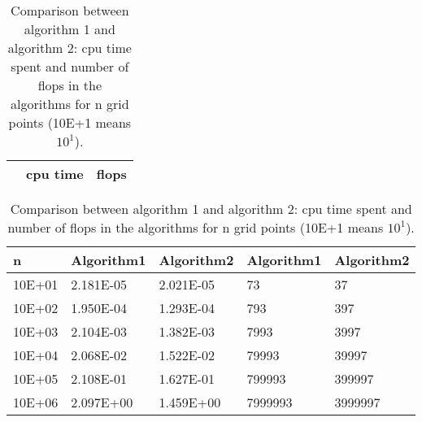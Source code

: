 \documentclass[11pt]{article}
\begin{document}
\begin{table}[H]
\begin{center}
\begin{tabular}{|p{24mm}|p{52.25mm}|p{52mm}|}
\hline
 &\hspace{17mm}  cpu time    & \hspace{22mm} flops \\ \hline
\end{tabular}
\begin{tabular}{|p{24mm}|p{24mm}|p{24mm}|p{24mm}|p{24mm}|}
\hspace{8mm} n  & Algorithm1 & Algorithm2& Algorithm1& Algorithm2  \\ \hline 
\hspace{4mm} 10E+01 & 2.181E-05 & 2.021E-05  & 73 & 37  \\ \hline
\hspace{4mm} 10E+02 & 1.950E-04 & 1.293E-04  & 793& 397\\ \hline
\hspace{4mm} 10E+03 & 2.104E-03 & 1.382E-03& 7993&  3997\\ \hline
\hspace{4mm} 10E+04 & 2.068E-02 & 1.522E-02 & 79993& 39997 \\ \hline
\hspace{4mm} 10E+05 & 2.108E-01 & 1.627E-01& 799993& 399997\\ \hline
\hspace{4mm} 10E+06 & 2.097E+00 & 1.459E+00& 7999993& 3999997 \\ \hline
\end{tabular}
\end{center}
\caption{Comparison between algorithm 1 and algorithm 2: cpu time spent and number of
flops in the algorithms for n grid points (10E+1 means $10^1$).}
\label{tabell1}
\end{table} 
\end{document}
